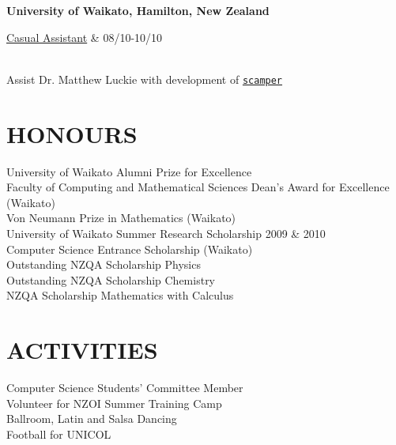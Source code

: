 \documentclass[margin,11pt]{res} %
\begin{document}
\begin{resume}
                {\bf University of Waikato, Hamilton, New Zealand} \\
                \begin{ncolumn}{2} %
                \underline{Casual Assistant} &   08/10-10/10
                \end{ncolumn} \\
                Assist Dr. Matthew Luckie with development of
                \href{http://www.wand.net.nz/scamper}{\tt{scamper}}


\section{HONOURS}
				University of Waikato Alumni Prize for Excellence \\
				Faculty of Computing and Mathematical Sciences Dean's Award for Excellence (Waikato) \\
				Von Neumann Prize in Mathematics (Waikato) \\
				University of Waikato Summer Research Scholarship 2009 \& 2010 \\
				Computer Science Entrance Scholarship (Waikato) \\
				Outstanding NZQA Scholarship Physics \\
				Outstanding NZQA Scholarship Chemistry \\
				NZQA Scholarship Mathematics with Calculus \\


\section{ACTIVITIES}
				Computer Science Students' Committee Member \\
				Volunteer for NZOI Summer Training Camp \\
				Ballroom, Latin and Salsa Dancing \\
				Football for UNICOL \\


\end{resume}
\end{document}

